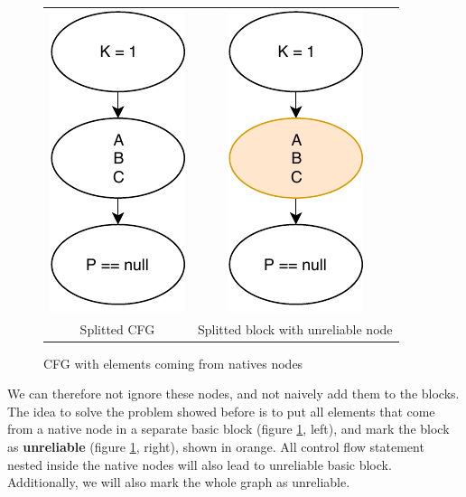 \begin{figure}[h]
	\caption{CFG with elements coming from natives nodes}
	\label{figure:two-unreliable-cfg}
	\setlength{\tabcolsep}{24pt}
	\begin{tabular}{cc}
		\includegraphics[]{figure/unreliable-cfg-1.pdf}  &
		\includegraphics[]{figure/unreliable-cfg-2.pdf}   \\ 
		Splitted CFG & Splitted block with unreliable node
	\end{tabular}
\end{figure}

We can therefore not ignore these nodes, and not naively add them to the blocks.
The idea to solve the problem showed before is to put all elements that come from a native node in a separate basic block (figure \ref{figure:two-unreliable-cfg}, left), and mark the block as \textbf{unreliable} (figure \ref{figure:two-unreliable-cfg}, right), shown in orange.
All control flow statement nested inside the native nodes will also lead to unreliable basic block.\newline
Additionally, we will also mark the whole graph as unreliable. 

